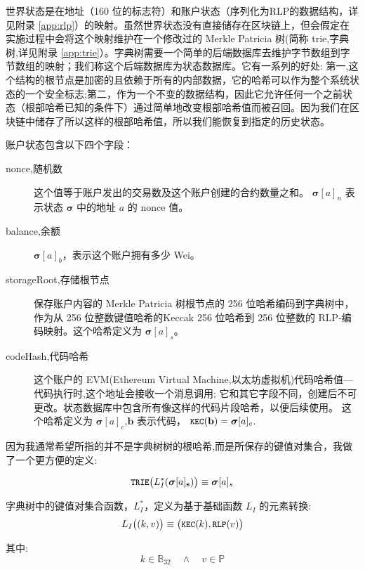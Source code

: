 \documentclass[9pt,oneside]{amsart}
\begin{document}
\begin{multicols}{2}
世界状态是在地址（160 位的标志符）和账户状态（序列化为RLP的数据结构，详见附录 \ref{app:rlp}）的映射。虽然世界状态没有直接储存在区块链上，但会假定在实施过程中会将这个映射维护在一个修改过的 Merkle Patricia 树(简称 trie,字典树,详见附录 \ref{app:trie}）。字典树需要一个简单的后端数据库去维护字节数组到字节数组的映射；我们称这个后端数据库为状态数据库。它有一系列的好处: 第一,这个结构的根节点是加密的且依赖于所有的内部数据，它的哈希可以作为整个系统状态的一个安全标志;第二，作为一个不变的数据结构，因此它允许任何一个之前状态（根部哈希已知的条件下）通过简单地改变根部哈希值而被召回。因为我们在区块链中储存了所以这样的根部哈希值，所以我们能恢复到指定的历史状态。

账户状态包含以下四个字段：
\begin{description}
\item[nonce,随机数] 这个值等于账户发出的交易数及这个账户创建的合约数量之和。 $\boldsymbol{\sigma}[a]_n$ 表示状态 $\boldsymbol{\sigma}$ 中的地址 $a$ 的 nonce 值。
\item[balance,余额] $\boldsymbol{\sigma}[a]_b$，表示这个账户拥有多少 Wei。
\item[storageRoot,存储根节点] 保存账户内容的 Merkle Patricia 树根节点的 256 位哈希编码到字典树中，作为从 256 位整数键值哈希的Keccak 256 位哈希到 256 位整数的 RLP-编码映射。这个哈希定义为 $\boldsymbol{\sigma}[a]_s$。
\item[codeHash,代码哈希] 这个账户的 EVM(Ethereum Virtual Machine,以太坊虚拟机)代码哈希值---代码执行时,这个地址会接收一个消息调用; 它和其它字段不同，创建后不可更改。状态数据库中包含所有像这样的代码片段哈希，以便后续使用。 这个哈希定义为 $\boldsymbol{\sigma}[a]_c$,$\mathbf{b}$ 表示代码， $\texttt{\small KEC}(\mathbf{b}) = \boldsymbol{\sigma}[a]_c$.
\end{description}


因为我通常希望所指的并不是字典树树的根哈希,而是所保存的键值对集合，我做了一个更方便的定义:

\begin{equation}
\texttt{\small TRIE}\big(L_I^*(\boldsymbol{\sigma}[a]_\mathbf{s})\big) \equiv \boldsymbol{\sigma}[a]_s
\end{equation}

字典树中的键值对集合函数，$L_I^*$，定义为基于基础函数 $L_I$ 的元素转换:
\begin{equation}
L_I\big( (k, v) \big) \equiv \big(\texttt{\small KEC}(k), \texttt{\small RLP}(v)\big)
\end{equation}

其中:
\begin{equation}
k \in \mathbb{B}_{32} \quad \wedge \quad v \in \mathbb{P}
\end{equation}


\end{multicols}
\end{document}
